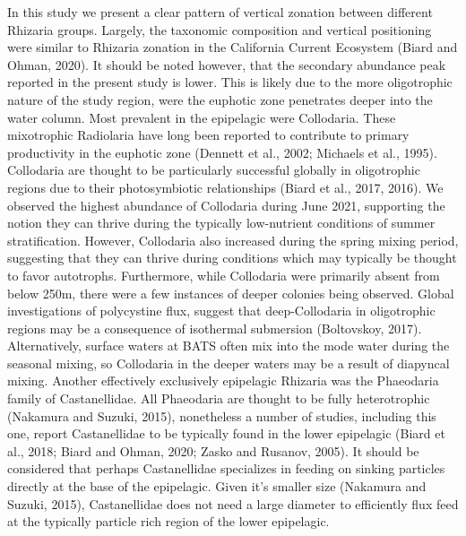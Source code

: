 \documentclass[
]{article}
\begin{document}
In this study we present a clear pattern of vertical zonation between
different Rhizaria groups. Largely, the taxonomic composition and
vertical positioning were similar to Rhizaria zonation in the California
Current Ecosystem (Biard and Ohman, 2020). It should be noted however,
that the secondary abundance peak reported in the present study is
lower. This is likely due to the more oligotrophic nature of the study
region, were the euphotic zone penetrates deeper into the water column.
Most prevalent in the epipelagic were Collodaria. These mixotrophic
Radiolaria have long been reported to contribute to primary productivity
in the euphotic zone (Dennett et al., 2002; Michaels et al., 1995).
Collodaria are thought to be particularly successful globally in
oligotrophic regions due to their photosymbiotic relationships (Biard et
al., 2017, 2016). We observed the highest abundance of Collodaria during
June 2021, supporting the notion they can thrive during the typically
low-nutrient conditions of summer stratification. However, Collodaria
also increased during the spring mixing period, suggesting that they can
thrive during conditions which may typically be thought to favor
autotrophs. Furthermore, while Collodaria were primarily absent from
below 250m, there were a few instances of deeper colonies being
observed. Global investigations of polycystine flux, suggest that
deep-Collodaria in oligotrophic regions may be a consequence of
isothermal submersion (Boltovskoy, 2017). Alternatively, surface waters
at BATS often mix into the mode water during the seasonal mixing, so
Collodaria in the deeper waters may be a result of diapyncal mixing.
Another effectively exclusively epipelagic Rhizaria was the Phaeodaria
family of Castanellidae. All Phaeodaria are thought to be fully
heterotrophic (Nakamura and Suzuki, 2015), nonetheless a number of
studies, including this one, report Castanellidae to be typically found
in the lower epipelagic (Biard et al., 2018; Biard and Ohman, 2020;
Zasko and Rusanov, 2005). It should be considered that perhaps
Castanellidae specializes in feeding on sinking particles directly at
the base of the epipelagic. Given it's smaller size (Nakamura and
Suzuki, 2015), Castanellidae does not need a large diameter to
efficiently flux feed at the typically particle rich region of the lower
epipelagic.
\end{document}
